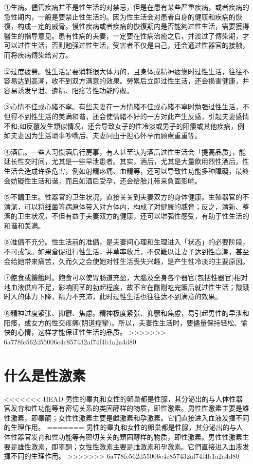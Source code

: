 \documentclass[12pt,UTF8]{ctexbook}
\begin{document}
①生病。儘管疾病并不是性生活的对禁忌，但是在患有某些严重疾病，或者疾病的急性期内，一般是要禁止性生活的。因为性生活会对患者自身的健康和疾病的恢復，构成一定的威脅。慢性疾病或者疾病的恢復期内是否能夠过性生活，需要獲得醫生的指导意见。患有性病的夫妻，一定要在性病治癒之后，并渡过了傳染期，才可以过性生活，否则勉强过性生活，受害者不仅是自己，还会通过性器官的接触，而将疾病傳染给对方。

②过度疲勞。性生活是要消耗很大体力的，且身体或精神疲憊时过性生活，往往不容易达到高潮，收不到双方满意的效果。勞累后立即过性生活，还会损害健康，并容易诱发早泄、遺精、阳痿等性功能障礙。

③心情不佳或心緒不寧。有些夫妻在一方情緒不佳或心緒不寧时勉强过性生活，不但得不到性生活的美满和谐，还会使情緒不好的一方对此产生反感，引起夫妻感情不和;如反覆发生類似情况，还会导致女子的性冷淡或男子的阳痿或其他疾病，例如夫妻因为生活琐事吵嘴后、夫妻问由于担心怀孕而顾慮重重等。

④酒后。一些人习惯酒后行房事，有人甚至认为酒后过性生活会「提高品质」，能延长性交时间，尤其是一些早泄患者。其实，酒后，尤其是大量飲用烈性酒后，性生活会造成许多危害，例如射精疼痛、血精等，还可以导致性功能多种障礙，最終会妨礙性生活和谐，而且如酒后受孕，还会给胎儿带来負面影响。

⑤不講卫生。性器官的卫生状况，直接关关到夫妻双方的身体健康。生殖器官的不清潔，可以将细菌等病原体带入对方体内，构成了对健康的威脅；反之，清新、整潔的卫生状况，不但有益于夫妻双方的健康，还可以增强性感受，有助于性生活的和谐和美满。

⑥准備不充分。性生活前的准備，是夫妻间心理和生理进入「状态」的必要阶段，不可或缺。如果倉促进行性生活，并草率收兵，不仅難以让妻子达到性高潮，甚至会给她带来痛苦，久而久之会使她对性生活喪失兴趣，是产生性冷淡的主要原因。

⑦飽食或饑餓时。飽食可以使胃肠道充盈，大腦及全身各个器官(包括性器官)相对地血液供应不足，影响阴茎的勃起程度，故不宜在剛剛吃完飯后就过性生活；饑餓时人的体力下降，精力不充沛，此时过性生活也往往达不到满意的效果。

⑧精神过度紧张、抑鬱、焦慮。精神极度紧张、抑鬱和焦慮，易引起男性的早泄和阳痿，或女方的性交疼痛(阴道痙攣)。所以，夫妻性生活时，要儘量保持轻松、愉快的心情，这样才能保证性生活的品质。
>>>>>>> 6a778fc562d55006c4c857432af74f4b1a2a4d80

\section{什么是性激素}

<<<<<<< HEAD
男性的睾丸和女性的卵巢都是性腺，其分泌出的与人体性器官发育和性功能等有密切关系的类固醇样的物质，即性激素。男性性激素主要是雄性激素，即睾酮；女性性激素主要是雌激素和孕激素。它们直接进入血液发揮不同的生理作用。
=======
男性的睾丸和女性的卵巢都是性腺，其分泌出的与人体性器官发育和性功能等有密切关关的類固醇样的物质，即性激素。男性性激素主要是雄性激素，即睾酮；女性性激素主要是雌激素和孕激素。它們直接进入血液发揮不同的生理作用。
>>>>>>> 6a778fc562d55006c4c857432af74f4b1a2a4d80
\end{document}

